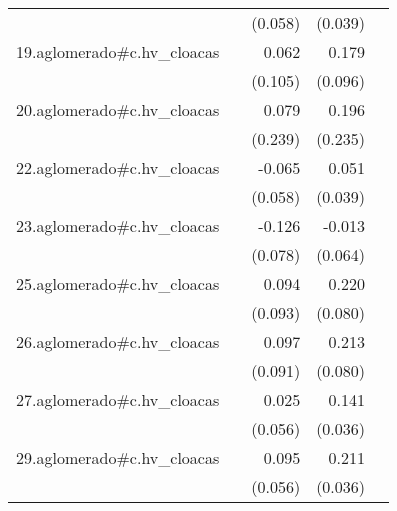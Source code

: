 {\begin{longtable}{l*{4}{D{.}{.}{-1}}}
            &                     &     (0.058)         &     (0.039)         &                     \\
\addlinespace
19.aglomerado#c.hv\_cloacas&                     &       0.062         &       0.179         &                     \\
            &                     &     (0.105)         &     (0.096)         &                     \\
\addlinespace
20.aglomerado#c.hv\_cloacas&                     &       0.079         &       0.196         &                     \\
            &                     &     (0.239)         &     (0.235)         &                     \\
\addlinespace
22.aglomerado#c.hv\_cloacas&                     &      -0.065         &       0.051         &                     \\
            &                     &     (0.058)         &     (0.039)         &                     \\
\addlinespace
23.aglomerado#c.hv\_cloacas&                     &      -0.126         &      -0.013         &                     \\
            &                     &     (0.078)         &     (0.064)         &                     \\
\addlinespace
25.aglomerado#c.hv\_cloacas&                     &       0.094         &       0.220\sym{**} &                     \\
            &                     &     (0.093)         &     (0.080)         &                     \\
\addlinespace
26.aglomerado#c.hv\_cloacas&                     &       0.097         &       0.213\sym{**} &                     \\
            &                     &     (0.091)         &     (0.080)         &                     \\
\addlinespace
27.aglomerado#c.hv\_cloacas&                     &       0.025         &       0.141\sym{***}&                     \\
            &                     &     (0.056)         &     (0.036)         &                     \\
\addlinespace
29.aglomerado#c.hv\_cloacas&                     &       0.095         &       0.211\sym{***}&                     \\
            &                     &     (0.056)         &     (0.036)         &                     \\

\end{longtable}}
